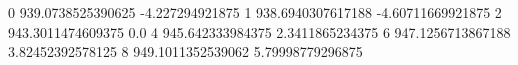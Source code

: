 0 939.0738525390625 -4.227294921875
1 938.6940307617188 -4.60711669921875
2 943.3011474609375 0.0
4 945.642333984375 2.3411865234375
6 947.1256713867188 3.82452392578125
8 949.1011352539062 5.79998779296875
